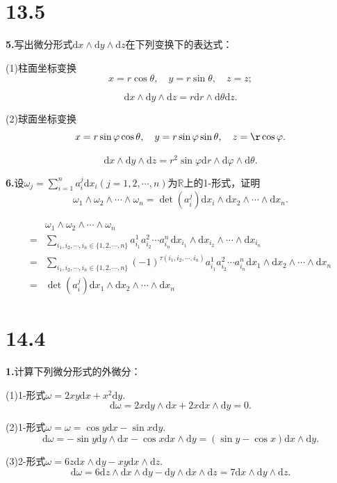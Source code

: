 \documentclass[12pt, a4paper]{article}
\newcommand{\RR}{\mathbb{R}}
\newcommand{\dif}{\mathrm{d}}
\begin{document}
\section*{13.5}
\textbf{5.}写出微分形式\(\dif x \wedge \dif y \wedge \dif z\)在下列变换下的表达式：

(1)柱面坐标变换
\[x = r\cos\theta, \quad y = r\sin \theta, \quad z = z;\]

\[\dif x \wedge \dif y \wedge \dif z = r\dif r \wedge \dif \theta \dif z.\]

(2)球面坐标变换
\[x = r\sin\varphi\cos\theta, \quad y = r\sin\varphi\sin\theta, \quad z = \r\cos\varphi.\]

\[\dif x \wedge \dif y \wedge \dif z = r^2\sin\varphi \dif r \wedge \dif \varphi \wedge \dif \theta.\]

\textbf{6.}设\(\omega_j = \sum_{i = 1}^{n} a_i^j\dif x_i(j = 1, 2, \cdots, n)\)为\(\RR\)上的1-形式，证明
\[\omega_1 \wedge \omega_2 \wedge \cdots \wedge \omega_n = \det(a_i^j)\dif x_i \wedge \dif x_2 \wedge \cdots \wedge \dif x_n.\]

\begin{align*}
&\omega_1 \wedge \omega_2 \wedge \cdots \wedge \omega_n \\
= &\sum_{i_1, i_2, \cdots, i_n \in \{1, 2, \cdots, n\}} a_{i_1}^1 a_{i_2}^2 \cdots a_{i_n}^n \dif x_{i_1} \wedge \dif x_{i_2} \wedge \cdots \wedge \dif x_{i_n} \\
= &\sum_{i_1, i_2, \cdots, i_n \in \{1, 2, \cdots, n\}} (-1)^{\tau(i_1, i_2, \cdots, i_n)} a_{i_1}^1 a_{i_2}^2 \cdots a_{i_n}^n \dif x_1 \wedge \dif x_2 \wedge \cdots \wedge \dif x_n \\
= &\det(a_i^j) \dif x_1 \wedge \dif x_2 \wedge \cdots \wedge \dif x_n
\end{align*}

\section*{14.4}
\textbf{1.}计算下列微分形式的外微分：

(1)1-形式\(\omega = 2xy\dif x + x^2\dif y\).
\[\dif\omega = 2x\dif y \wedge \dif x + 2x \dif x \wedge \dif y = 0.\]

(2)1-形式\(\omega = \omega = \cos y \dif x - \sin x \dif y\).
\[\dif\omega = -\sin y \dif y \wedge \dif x - \cos x \dif x \wedge \dif y = (\sin y - \cos x)\dif x \wedge \dif y.\]

(3)2-形式\(\omega = 6z\dif x \wedge \dif y - xy \dif x \wedge \dif z\).
\[\dif\omega = 6 \dif z \wedge \dif x \wedge \dif y - \dif y \wedge \dif x \wedge \dif z = 7\dif x \wedge \dif y \wedge \dif z.\]
\end{document}
